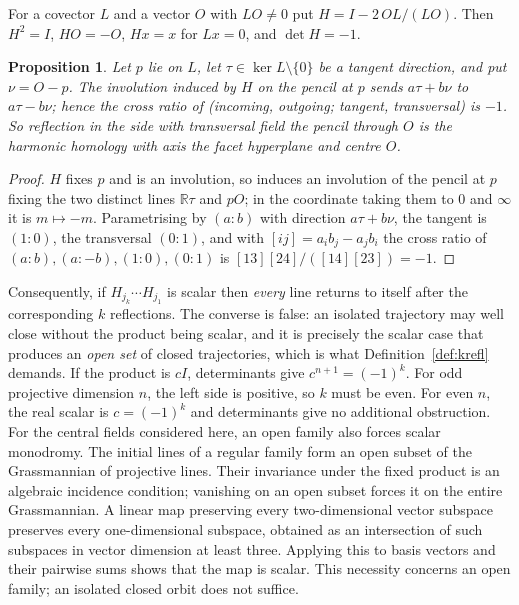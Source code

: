 \documentclass[11pt,a4paper]{article}
\theoremstyle{plain}
\newtheorem{proposition}[theorem]{Proposition}
\theoremstyle{definition}
\theoremstyle{remark}
\begin{document}
For a covector $L$ and a vector $O$ with $LO\neq0$ put $H=I-2\,OL/(LO)$. Then
$H^2=I$, $HO=-O$, $Hx=x$ for $Lx=0$, and $\det H=-1$.

\begin{proposition}\label{prop:law}
Let $p$ lie on $L$, let $\tau\in\ker L\setminus\{0\}$ be a tangent direction, and
put $\nu=O-p$. The involution induced by $H$
on the pencil at $p$ sends $a\tau+b\nu$ to $a\tau-b\nu$; hence the cross ratio of
(incoming, outgoing; tangent, transversal) is $-1$. So reflection in the side with
transversal field the pencil through $O$ \emph{is} the harmonic homology with axis
the facet hyperplane and centre $O$.
\end{proposition}

\begin{proof}
$H$ fixes $p$ and is an involution, so induces an involution of the pencil at $p$
fixing the two distinct lines $\mathbb{R}\tau$ and $pO$; in the coordinate taking them to $0$
and $\infty$ it is $m\mapsto-m$. Parametrising by $(a:b)$ with direction
$a\tau+b\nu$, the tangent is $(1:0)$, the transversal $(0:1)$, and with
$[ij]=a_ib_j-a_jb_i$ the cross ratio of $(a:b),(a:-b),(1:0),(0:1)$ is
$[13][24]/([14][23])=-1$.
\end{proof}

Consequently, if $H_{j_k}\cdots H_{j_1}$ is scalar then \emph{every} line returns to
itself after the corresponding $k$ reflections. The converse is false: an isolated
trajectory may well close without the product being scalar, and it is precisely the
scalar case that produces an \emph{open set} of closed trajectories, which is what
Definition~\ref{def:krefl} demands. If the product is $cI$, determinants give
$c^{n+1}=(-1)^k$. For odd projective dimension $n$, the left side is positive,
so $k$ must be even. For even $n$, the real scalar is $c=(-1)^k$ and
determinants give no additional obstruction.
For the central fields considered here, an open family also forces scalar
monodromy. The initial lines of a regular family form an open subset of the
Grassmannian of projective lines. Their invariance under the fixed product
is an algebraic incidence condition; vanishing on an open subset forces
it on the entire Grassmannian. A linear map preserving every two-dimensional
vector subspace preserves every one-dimensional subspace, obtained as an
intersection of such subspaces in vector dimension at least three.
Applying this to basis vectors and their pairwise sums shows that the map
is scalar. This necessity concerns an open family; an isolated closed orbit
does not suffice.
\end{document}
